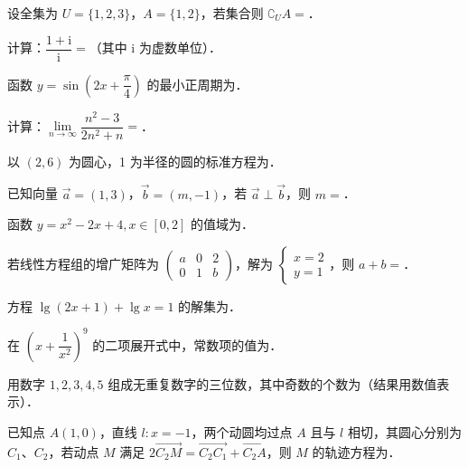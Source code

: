 \begin{question}
设全集为 \(U=\{1,2,3\}\)，\(A=\{1,2\}\)，若集合则 \(\complement_{U}A=\)\gkblank{}．

\end{question}
\begin{question}
计算：\(\dfrac{1+\mathrm{i}}{\mathrm{i}}=\)\gkblank{}（其中 \(\mathrm{i}\) 为虚数单位）．

\end{question}
\begin{question}
函数 \(y=\sin\left(2x+\dfrac{\pi}{4}\right)\) 的最小正周期为\gkblank{}．

\end{question}
\begin{question}
计算：\(\lim\limits_{n\to\infty}\dfrac{n^{2}-3}{2n^{2}+n}=\)\gkblank{}．

\end{question}
\begin{question}
以 \((2,6)\) 为圆心，1 为半径的圆的标准方程为\gkblank{}．

\end{question}
\begin{question}
已知向量 \(\vec{a}=(1,3)\)，\(\vec{b}=(m,-1)\)，若 \(\vec{a}\perp\vec{b}\)，则 \(m=\)\gkblank{}．

\end{question}
\begin{question}
函数 \(y=x^{2}-2x+4,x\in[0,2]\) 的值域为\gkblank{}．

\end{question}
\begin{question}
若线性方程组的增广矩阵为 $\begin{pmatrix} a & 0 & 2\\ 0 & 1 & b \end{pmatrix}$，解为 $\begin{cases} x=2\\ y=1 \end{cases}$，则 \(a+b=\)\gkblank{}．

\end{question}
\begin{question}
方程 \(\lg(2x+1)+\lg x=1\) 的解集为\gkblank{}．

\end{question}
\begin{question}
在 \(\left(x+\dfrac{1}{x^{2}}\right)^{9}\) 的二项展开式中，常数项的值为\gkblank{}．

\end{question}
\begin{question}
用数字 \(1,2,3,4,5\) 组成无重复数字的三位数，其中奇数的个数为\gkblank{}（结果用数值表示）．

\end{question}
\begin{question}
已知点 \(A(1,0)\)，直线 \(l:x=-1\)，两个动圆均过点 \(A\) 且与 \(l\) 相切，其圆心分别为 \(C_{1}\)、\(C_{2}\)，若动点 \(M\) 满足 \(2\overrightarrow{C_{2}M}=\overrightarrow{C_{2}C_{1}}+\overrightarrow{C_{2}A}\)，则 \(M\) 的轨迹方程为\gkblank{}．

\end{question}

